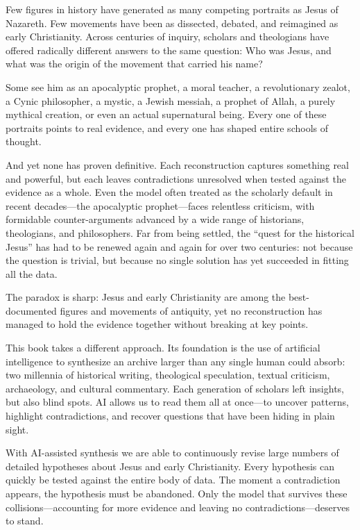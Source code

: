 Few figures in history have generated as many competing portraits as Jesus of Nazareth.
Few movements have been as dissected, debated, and reimagined as early Christianity.
Across centuries of inquiry, scholars and theologians have offered radically different answers to the same question: Who was Jesus, and what was the origin of the movement that carried his name?

Some see him as an apocalyptic prophet, a moral teacher, a revolutionary zealot, a Cynic philosopher, a mystic, a Jewish messiah, a prophet of Allah, a purely mythical creation, or even an actual supernatural being.
Every one of these portraits points to real evidence, and every one has shaped entire schools of thought.

And yet none has proven definitive.
Each reconstruction captures something real and powerful, but each leaves contradictions unresolved when tested against the evidence as a whole.
Even the model often treated as the scholarly default in recent decades—the apocalyptic prophet—faces relentless criticism, with formidable counter-arguments advanced by a wide range of historians, theologians, and philosophers.
Far from being settled, the ``quest for the historical Jesus'' has had to be renewed again and again for over two centuries: not because the question is trivial, but because no single solution has yet succeeded in fitting all the data.

The paradox is sharp: Jesus and early Christianity are among the best-documented figures and movements of antiquity, yet no reconstruction has managed to hold the evidence together without breaking at key points.

This book takes a different approach.
Its foundation is the use of artificial intelligence to synthesize an archive larger than any single human could absorb: two millennia of historical writing, theological speculation, textual criticism, archaeology, and cultural commentary.
Each generation of scholars left insights, but also blind spots.
AI allows us to read them all at once—to uncover patterns, highlight contradictions, and recover questions that have been hiding in plain sight.

With AI-assisted synthesis we are able to continuously revise large numbers of detailed hypotheses about Jesus and early Christianity.
Every hypothesis can quickly be tested against the entire body of data.
The moment a contradiction appears, the hypothesis must be abandoned.
Only the model that survives these collisions---accounting for more evidence and leaving no contradictions---deserves to stand.

